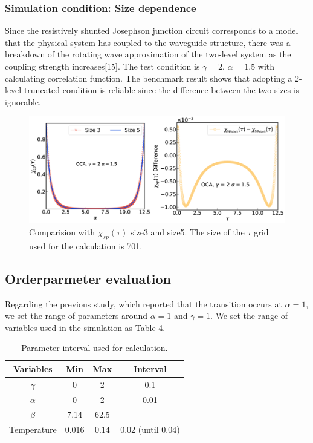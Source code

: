 \documentclass{article}[12pt]
\numberwithin{equation}{section}
\begin{document}
\begin{spacing}{1.5}
\subsubsection*{Simulation condition: Size dependence}
Since the resistively shunted Josephson junction circuit corresponds to a model that the physical system has coupled to the waveguide structure,
there was a breakdown of the rotating wave approximation of the two-level system as the coupling strength increases[15]. 
The test condition is $\gamma =2$, $\alpha = 1.5$ with calculating correlation function. 
The benchmark result shows that adopting a 2-level truncated condition is reliable since the difference between the two sizes is ignorable.
\begin{figure}[H]
  \centerline{\includegraphics[width=13cm]{TexFigure/4/4_2_02_sizediff.png}}
  \caption{Comparision with $\chi_{sp}(\tau)$ size3 and size5. The size of the $\tau$ grid used for the calculation is 701.}
\end{figure}
\subsection{Orderparmeter evaluation}
Regarding the previous study, which reported that the transition occurs at $\alpha = 1$, we set the range of parameters around $\alpha = 1$ and $\gamma = 1$.
We set the range of variables used in the simulation as Table 4.
\begin{table}[htbp]
  \centering
  \renewcommand{\arraystretch}{1.2}  %
  \begin{tabular}{@{}cccc@{}}
  \toprule
  \textbf{Variables} & \textbf{Min} & \textbf{Max}  & \textbf{Interval}\\ 
  \midrule
  $\gamma$ & 0 & 2 & 0.1 \\
  $\alpha$ & 0 & 2 & 0.01 \\
  $\beta$ & 7.14 & 62.5 &  \\
  Temperature & 0.016 & 0.14 & 0.02 (until 0.04) \\
  \bottomrule
  \end{tabular}
  \caption{Parameter interval used for calculation.}
  \end{table}

\end{spacing}
\end{document}
